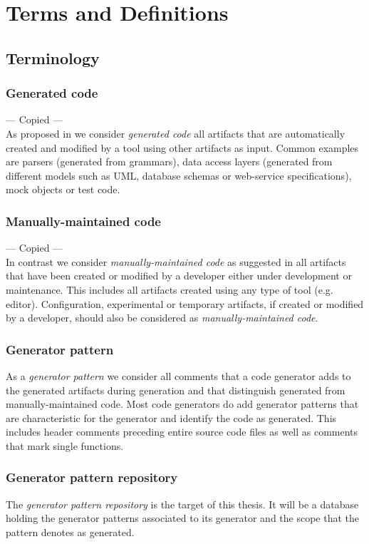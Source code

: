 
\chapter{Terms and Definitions}\label{chapter:terms}

\section{Terminology}
\subsection{Generated code}
--- Copied ---\\
As proposed in \cite{Alves2011} we consider \textit{generated code} all artifacts that are automatically created and modified by a tool using other artifacts as input. Common examples are parsers (generated from grammars), data access layers (generated from different models such as UML, database schemas or web-service specifications), mock objects or test code.

\subsection{Manually-maintained code}
--- Copied ---\\
In contrast we consider \textit{manually-maintained code} as suggested in \cite{Alves2011} all artifacts that have been created or modified by a developer either under development or maintenance. This includes all artifacts created using any type of tool (e.g. editor). Configuration, experimental or temporary artifacts, if created or modified by a developer, should also be considered as \textit{manually-maintained code}.
\subsection{Generator pattern}
As a \textit{generator pattern} we consider all comments that a code generator adds to the generated artifacts during generation and that distinguish generated from manually-maintained code. Most code generators do add generator patterns that are characteristic for the generator and identify the code as generated. This includes header comments preceding entire source code files as well as comments that mark single functions.

\subsection{Generator pattern repository}
The \textit{generator pattern repository} is the target of this thesis. It will be a database holding the generator patterns associated to its generator and the scope that the pattern denotes as generated.

